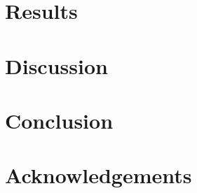 \documentclass[a4paper,fleqn]{cas-dc}
\begin{document}
\section{Results}


\section{Discussion}


\section{Conclusion}


\printcredits

\section*{Acknowledgements}




\end{document}
